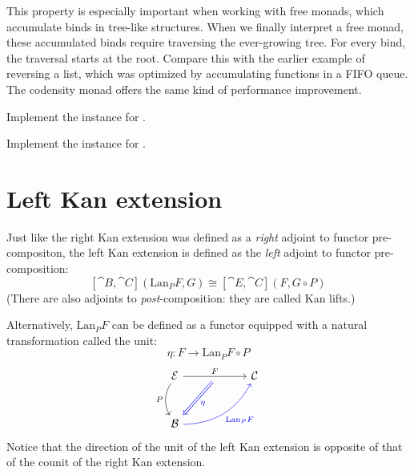 \documentclass[DaoFP]{subfiles}
\begin{document}
This property is especially important when working with free monads, which accumulate binds in tree-like structures. When we finally interpret a free monad, these accumulated binds require traversing the ever-growing tree. For every bind, the traversal starts at the root. Compare this with the earlier example of reversing a list, which was optimized by accumulating functions in a FIFO queue. The codensity monad offers the same kind of performance improvement.

\begin{exercise}
Implement the  instance for .
\end{exercise}
\begin{exercise}
Implement the  instance for .
\end{exercise}

\section{Left Kan extension}

Just like the right Kan extension was defined as a \emph{right} adjoint to functor pre-compositon, the left Kan extension is defined as the \emph{left} adjoint to functor pre-composition:
\[ [\cat B, \cat C](\text{Lan}_P F , G) \cong  [\cat E, \cat C] (F, G \circ P) \]
 (There are also adjoints to \emph{post}-composition: they are called Kan lifts.)

Alternatively, $\text{Lan}_P F$ can be defined as a functor equipped with a natural transformation called the unit:
\[ \eta \colon F \to \text{Lan}_P F \circ P \]
\[
 \begin{tikzcd} [row sep=1cm, column sep=1cm]
 \cat E
 \arrow[rr, "F", "" {name=ID, below} ]
 \arrow[d, bend right, "P"']
 && \cat C
 \\
 \cat B
  \arrow[urr, blue, bend right, "\text{Lan}_P F"']
 \arrow[Rightarrow, blue, "\eta",  from=ID]
 \end{tikzcd}
\]
Notice that the direction of the unit of the left Kan extension is opposite of that of the counit of the right Kan extension.
\end{document}
